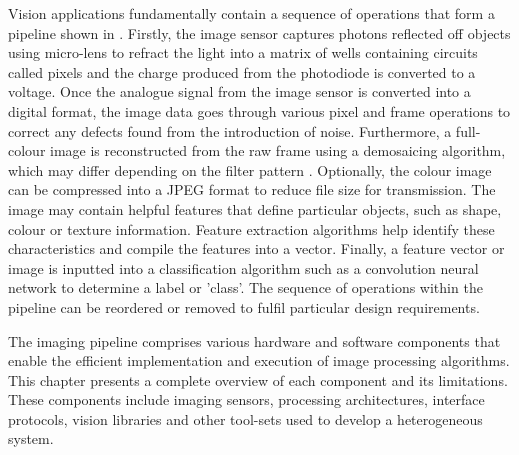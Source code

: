 Vision applications fundamentally contain a sequence of operations that form a pipeline shown in . Firstly, the image sensor captures photons reflected off objects using micro-lens to refract the light into a matrix of wells containing circuits called pixels and the charge produced from the photodiode is converted to a voltage. Once the analogue signal from the image sensor is converted into a digital format, the image data goes through various pixel and frame operations to correct any defects found from the introduction of noise. Furthermore, a full-colour image is reconstructed from the raw frame using a demosaicing algorithm, which may differ depending on the filter pattern . Optionally, the colour image can be compressed into a JPEG format to reduce file size for transmission. The image may contain helpful features that define particular objects, such as shape, colour or texture information. Feature extraction algorithms help identify these characteristics and compile the features into a vector. Finally, a feature vector or image is inputted into a classification algorithm such as a convolution neural network to determine a label or 'class'. The sequence of operations within the pipeline can be reordered or removed to fulfil particular design requirements. %

The imaging pipeline comprises various hardware and software components that enable the efficient implementation and execution of image processing algorithms. This chapter presents a complete overview of each component and its limitations. These components include imaging sensors, processing architectures, interface protocols, vision libraries and other tool-sets used to develop a heterogeneous system. 


